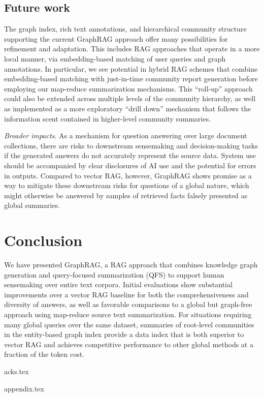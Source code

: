 \documentclass{article}
\begin{document}
\subsection{Future work}
The graph index, rich text annotations, and hierarchical community structure supporting the current GraphRAG approach offer many possibilities for refinement and adaptation.
This includes RAG approaches that operate in a more local manner, via embedding-based matching of user queries and graph annotations.
In particular, we see potential in hybrid RAG schemes that combine embedding-based matching with just-in-time community report generation before employing our map-reduce summarization mechanisms.
This ``roll-up'' approach could also be extended across multiple levels of the community hierarchy, as well as implemented as a more exploratory ``drill down'' mechanism that follows the information scent contained in higher-level community summaries.

\emph{Broader impacts}. As a mechanism for question answering over large document collections, there are risks to downstream sensemaking and decision-making tasks if the generated answers do not accurately represent the source data.
System use should be accompanied by clear disclosures of AI use and the potential for errors in outputs.
Compared to vector RAG, however, GraphRAG shows promise as a way to mitigate these downstream risks for questions of a global nature, which might otherwise be answered by samples of retrieved facts falsely presented as global summaries.

\section{Conclusion}

We have presented GraphRAG, a RAG approach that combines knowledge graph generation and query-focused summarization (QFS) to support human sensemaking over entire text corpora.
Initial evaluations show substantial improvements over a vector RAG baseline for both the comprehensiveness and diversity of answers, as well as favorable comparisons to a global but graph-free approach using map-reduce source text summarization. 
For situations requiring many global queries over the same dataset, summaries of root-level communities in the entity-based graph index provide a data index that is both superior to vector RAG and achieves competitive performance to other global methods at a fraction of the token cost.

{acks.tex}

\medskip



\appendix

\newpage
{appendix.tex}
\end{document}
